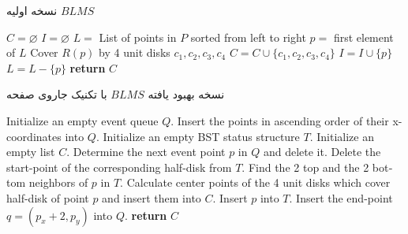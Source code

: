 \documentclass[12pt]{article}
\begin{document}
\begin{algorithm}[!h]
\caption{
نسخه اولیه $BLMS$
}
\label{blms1}
\begin{latin}
\begin{algorithmic}[1]
\STATE $C = \varnothing$
\STATE $I = \varnothing$
\STATE $L =$ List of points in $P$ sorted from left to right
    \STATE $p =$ first element of $L$
        \STATE Cover $R(p)$ by 4 unit disks $c_{1}, c_{2}, c_{3}, c_{4}$
        \STATE $C = C \cup \{ c_{1}, c_{2}, c_{3}, c_{4} \}$
        \STATE $I = I \cup \{ p \}$
    \ENDIF
    \STATE $L = L - \{ p \}$
\ENDWHILE
\STATE \textbf{return} $C$
\end{algorithmic}
\end{latin}
\end{algorithm}

\begin{algorithm}[H]
\singlespacing
\caption{
نسخه بهبود یافته $BLMS$ با تکنیک جاروی صفحه
}
\label{blms2}
\begin{latin}
\begin{algorithmic}[1]
\STATE Initialize an empty event queue $Q$. Insert the points in ascending order of their x-coordinates into $Q$.
\STATE Initialize an empty BST status structure $T$.
\STATE Initialize an empty list $C$.
    \STATE Determine the next event point $p$ in $Q$ and delete it.
        \STATE Delete the start-point of the corresponding half-disk from $T$.
    \ELSE
        \STATE Find the 2 top and the 2 bottom neighbors of $p$ in $T$.
            \STATE Calculate center points of the 4 unit disks which cover half-disk of point $p$ and insert them into $C$.
            \STATE Insert $p$ into $T$.
            \STATE Insert the end-point $q=(p_x + 2, p_y)$ into $Q$.
        \ENDIF
    \ENDIF
\ENDWHILE
\STATE \textbf{return} $C$
\end{algorithmic}
\end{latin}
\end{algorithm}
\end{document}
